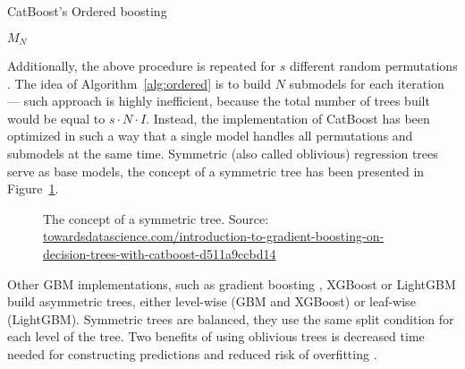 \documentclass[magisterska, english]{pwr_wmat_praca_dyplomowa}
\theoremstyle{plain}
\numberwithin{theorem}{chapter}
\theoremstyle{definition}
\numberwithin{theorem}{chapter}
\begin{document}
\begin{algorithm}[H]
\caption{CatBoost's Ordered boosting}\label{alg:ordered}
 \Return $M_N$
\end{algorithm}

Additionally, the above procedure is repeated for $s$ different random permutations \cite{comparative_analysis}.
The idea of Algorithm~\ref{alg:ordered} is to build $N$ submodels for each iteration --- such approach is highly inefficient, because the total number of trees built would be equal to $s\cdot N\cdot I$. Instead, the implementation of CatBoost has been optimized in such a way that a single model handles all permutations and submodels at the same time. Symmetric (also called oblivious) regression trees serve as base models, the concept of a symmetric tree has been presented in Figure~\ref{fig:symmetric_trees}.

\begin{figure}[H]
	\centering
	\caption{The concept of a symmetric tree. Source: \small{\url{towardsdatascience.com/introduction-to-gradient-boosting-on-decision-trees-with-catboost-d511a9ccbd14}}}
	\label{fig:symmetric_trees}
\end{figure}

Other GBM implementations, such as gradient boosting \cite{friedman_gbm}, XGBoost \cite{xgboost} or LightGBM \cite{lightgbm} build asymmetric trees, either level-wise (GBM and XGBoost) or leaf-wise (LightGBM). Symmetric trees are balanced, they use the same split condition for each level of the tree. Two benefits of using oblivious trees is decreased time needed for constructing predictions and reduced risk of overfitting \cite{catboost}.
\end{document}
